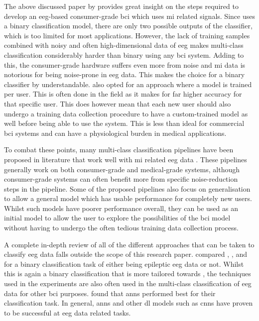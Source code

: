The above discussed paper by \citet{cheap_bci_feasibility} provides great insight on the steps required to develop an \gls{eeg}-based consumer-grade \gls{bci} which uses \gls{mi} related signals.
Since \citet{cheap_bci_feasibility} uses a binary classification model, there are only two possible outputs of the classifier, which is too limited for most applications.
However, the lack of training samples combined with noisy and often high-dimensional data of \gls{eeg} makes multi-class classification considerably harder than binary using any \gls{bci} system.
Adding to this, the consumer-grade hardware suffers even more from noise and \gls{mi} data is notorious for being noise-prone in \gls{eeg} data.
This makes the choice for a binary classifier by  understandable.
 also opted for an approach where a model is trained per user.
This is often done in the field as it makes for far higher accuracy for that specific user.
This does however mean that each new user should also undergo a training data collection procedure to have a custom-trained model as well before being able to use the system.
This is less than ideal for commercial \gls{bci} systems and can have a physiological burden in medical applications.

To combat these points, many multi-class classification pipelines have been proposed in literature that work well with \gls{mi} related \gls{eeg} data \citep{fbcnet, eeg_mi_model_mussi, eeg_mi_model_lda_csp, eeg_mi_model_deep_cnn_spatial_filters, eeg_mi_model_image_based, eeg_model_fbcsp, eeg_model_hbm, eeg_model_esi, eeg_model_eegnet}.
These pipelines generally work on both consumer-grade and medical-grade systems, although consumer-grade systems can often benefit more from specific noise-reduction steps in the pipeline.
Some of the proposed pipelines also focus on generalisation to allow a general model which has usable performance for completely new users.
Whilst such models have poorer performance overall, they can be used as an initial model to allow the user to explore the possibilities of the \gls{bci} model without having to undergo the often tedious training data collection process. 

A complete in-depth review of all of the different approaches that can be taken to classify \gls{eeg} data falls outside the scope of this research paper.
\citet{eeg_analysis_methods_epilepsy_review} compared , ,  and  for a binary classification task of either being epileptic \gls{eeg} data or not.
Whilst this is again a binary classification that is more tailored towards , the techniques used in the experiments are also often used in the multi-class classification of \gls{eeg} data for other \gls{bci} purposes.
 found that \glspl{ann} performed best for their classification task.
In general, \glspl{ann} and other \gls{dl} models such as \glspl{cnn} have proven to be successful at \gls{eeg} data related tasks.

